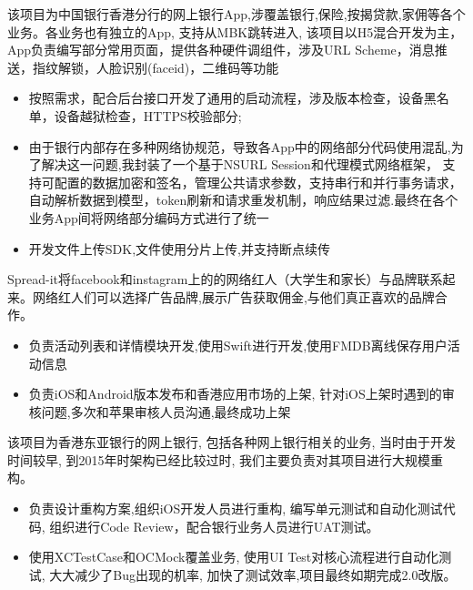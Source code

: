 \documentclass{resume}
\begin{document}
\begin{onehalfspacing}
  该项目为中国银行香港分行的网上银行App,涉覆盖银行,保险,按揭贷款,家佣等各个业务。各业务也有独立的App, 支持从MBK跳转进入, 该项目以H5混合开发为主，
  App负责编写部分常用页面，提供各种硬件调组件，涉及URL Scheme，消息推送，指纹解锁，人脸识别(faceid)，二维码等功能
\begin{itemize}
  \item 按照需求，配合后台接口开发了通用的启动流程，涉及版本检查，设备黑名单，设备越狱检查，HTTPS校验部分;
  \item 由于银行内部存在多种网络协规范，导致各App中的网络部分代码使用混乱,为了解决这一问题,我封装了一个基于NSURL Session和代理模式网络框架，
  支持可配置的数据加密和签名，管理公共请求参数，支持串行和并行事务请求，自动解析数据到模型，token刷新和请求重发机制，响应结果过滤.最终在各个业务App间将网络部分编码方式进行了统一
  \item 开发文件上传SDK,文件使用分片上传,并支持断点续传
\end{itemize}
\end{onehalfspacing}

\begin{onehalfspacing}
Spread-it将facebook和instagram上的的网络红人（大学生和家长）与品牌联系起来。网络红人们可以选择广告品牌,展示广告获取佣金,与他们真正喜欢的品牌合作。    
\begin{itemize}
  \item 负责活动列表和详情模块开发,使用Swift进行开发,使用FMDB离线保存用户活动信息
  \item 负责iOS和Android版本发布和香港应用市场的上架, 针对iOS上架时遇到的审核问题,多次和苹果审核人员沟通,最终成功上架
\end{itemize}
\end{onehalfspacing}

\begin{onehalfspacing}
  该项目为香港东亚银行的网上银行,  包括各种网上银行相关的业务,  当时由于开发时间较早, 到2015年时架构已经比较过时,  我们主要负责对其项目进行大规模重构。    
\begin{itemize}
  \item 负责设计重构方案,组织iOS开发人员进行重构, 编写单元测试和自动化测试代码, 组织进行Code Review，配合银行业务人员进行UAT测试。
  \item 使用XCTestCase和OCMock覆盖业务, 使用UI Test对核心流程进行自动化测试, 大大减少了Bug出现的机率, 加快了测试效率,项目最终如期完成2.0改版。
\end{itemize}
\end{onehalfspacing}
\end{document}
